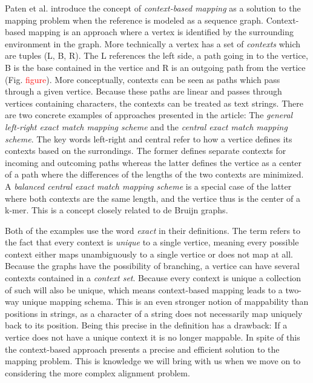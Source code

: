 \documentclass[thesis.tex]{subfiles}
\begin{document}
Paten et al.\cite{mapping_to_a_reference_genome_structure} introduce the concept of \textit{context-based mapping} as a solution to the mapping problem when the reference is modeled as a sequence graph. Context-based mapping is an approach where a vertex is identified by the surrounding environment in the graph. More technically a vertex has a set of \textit{contexts} which are tuples (L, B, R). The L references the left side, a path going in to the vertice, B is the base contained in the vertice and R is an outgoing path from the vertice (Fig. \textcolor{red}{figure}). More conceptually, contexts can be seen as paths which pass through a given vertice. Because these paths are linear and passes through vertices containing characters, the contexts can be treated as text strings. There are two concrete examples of approaches presented in the article: The \textit{general left-right exact match mapping scheme} and the \textit{central exact match mapping scheme}. The key words left-right and central refer to how a vertice defines its contexts based on the surrondings. The former defines separate contexts for incoming and outcoming paths whereas the latter defines the vertice as a center of a path where the differences of the lengths of the two contexts are minimized. A  \textit{balanced central exact match mapping scheme} is a special case of the latter where both contexts are the same length, and the vertice thus is the center of a k-mer. This is a concept closely related to de Bruijn graphs.\\
\par\noindent
Both of the examples use the word \textit{exact} in their definitions. The term refers to the fact that every context is \textit{unique} to a single vertice, meaning every possible context either maps unambiguously to a single vertice or does not map at all. Because the graphs have the possibility of branching, a vertice can have several contexts contained in a \textit{context set}. Because every context is unique a collection of such will also be unique, which means context-based mapping leads to a two-way unique mapping schema. This is an even stronger notion of mappability than positions in strings, as a character of a string does not necessarily map uniquely back to its position. Being this precise in the definition has a drawback: If a vertice does not have a unique context it is no longer mappable. In spite of this the context-based approach presents a precise and efficient solution to the mapping problem. This is knowledge we will bring with us when we move on to considering the more complex alignment problem.
\end{document}

